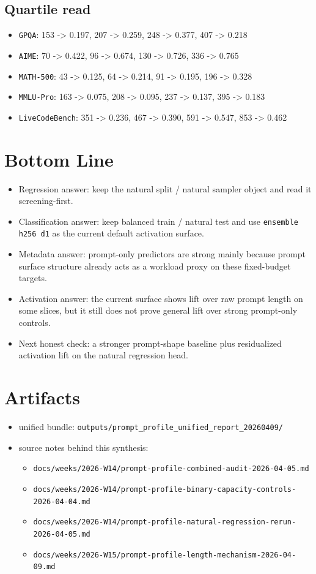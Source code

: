 \documentclass[11pt]{article}
\begin{document}
\subsection*{Quartile read}
\begin{itemize}[leftmargin=1.5em]
\item \texttt{GPQA}: 153 -> 0.197, 207 -> 0.259, 248 -> 0.377, 407 -> 0.218
\item \texttt{AIME}: 70 -> 0.422, 96 -> 0.674, 130 -> 0.726, 336 -> 0.765
\item \texttt{MATH-500}: 43 -> 0.125, 64 -> 0.214, 91 -> 0.195, 196 -> 0.328
\item \texttt{MMLU-Pro}: 163 -> 0.075, 208 -> 0.095, 237 -> 0.137, 395 -> 0.183
\item \texttt{LiveCodeBench}: 351 -> 0.236, 467 -> 0.390, 591 -> 0.547, 853 -> 0.462
\end{itemize}

\section*{Bottom Line}
\begin{itemize}[leftmargin=1.5em]
\item Regression answer: keep the natural split / natural sampler object and read it screening-first.
\item Classification answer: keep balanced train / natural test and use \texttt{ensemble h256 d1} as the current default activation surface.
\item Metadata answer: prompt-only predictors are strong mainly because prompt surface structure already acts as a workload proxy on these fixed-budget targets.
\item Activation answer: the current surface shows lift over raw prompt length on some slices, but it still does not prove general lift over strong prompt-only controls.
\item Next honest check: a stronger prompt-shape baseline plus residualized activation lift on the natural regression head.
\end{itemize}

\section*{Artifacts}
\begin{itemize}[leftmargin=1.5em]
\item unified bundle: \texttt{outputs/prompt\_profile\_unified\_report\_20260409/}
\item source notes behind this synthesis:
  \begin{itemize}[leftmargin=1.5em]
  \item \texttt{docs/weeks/2026-W14/prompt-profile-combined-audit-2026-04-05.md}
  \item \texttt{docs/weeks/2026-W14/prompt-profile-binary-capacity-controls-2026-04-04.md}
  \item \texttt{docs/weeks/2026-W14/prompt-profile-natural-regression-rerun-2026-04-05.md}
  \item \texttt{docs/weeks/2026-W15/prompt-profile-length-mechanism-2026-04-09.md}
  \end{itemize}
\end{itemize}
\end{document}
